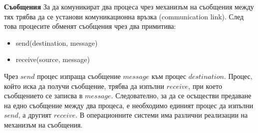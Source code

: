 \documentclass{article}
\begin{document}
\textbf{Съобщения} \newline
За да комуникират два процеса чрез механизъм на съобщения между тях трябва да се установи комуникационна връзка (communication link). След това процесите
обменят съобщения чрез два примитива:
\begin{itemize}
    \item send(destination, message)
    \item receive(source, message)
\end{itemize}
Чрез $send$ процес изпраща съобщение $message$ към процес $destination$. Процес, който иска да получи съобщение, трябва да изпълни $receive$, при което
съобщението се записва в $message$. Следователно, за да се осъществи предаване на едно съобщение между два процеса, е необходимо единият процес да изпълни
$send$, а другият $receive$. В операционните системи има различни реализации на механизъм на съобщения.
\end{document}
